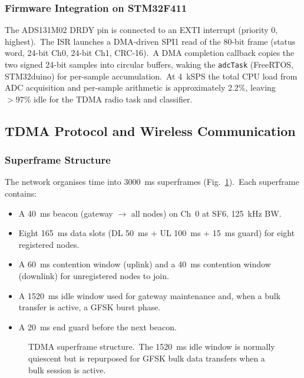 \documentclass[conference]{IEEEtran}
\begin{document}
\subsubsection{Firmware Integration on STM32F411}

The ADS131M02 DRDY pin is connected to an EXTI interrupt (priority 0,
highest).\ The ISR launches a DMA-driven SPI1 read of the 80-bit frame
(status word, 24-bit Ch0, 24-bit Ch1, CRC-16).\ A DMA completion
callback copies the two signed 24-bit samples into circular buffers,
waking the \texttt{adcTask} (FreeRTOS, STM32duino) for per-sample
accumulation.\ At 4~kSPS the total CPU load from ADC acquisition and
per-sample arithmetic is approximately 2.2\%, leaving \(>97\%\) idle
for the TDMA radio task and classifier.

\subsection{TDMA Protocol and Wireless Communication}
\label{ssec:tdma}

\subsubsection{Superframe Structure}

The network organises time into 3000~ms superframes (Fig.\
\ref{fig:superframe}).\ Each superframe contains:
\begin{itemize}
  \item A 40~ms beacon (gateway \(\to\) all nodes) on Ch~0 at
        SF6, 125~kHz BW.
  \item Eight 165~ms data slots (DL 50~ms + UL 100~ms + 15~ms guard)
        for eight registered nodes.
  \item A 60~ms contention window (uplink) and a 40~ms contention
        window (downlink) for unregistered nodes to join.
  \item A 1520~ms idle window used for gateway maintenance and,
        when a bulk transfer is active, a GFSK burst phase.
  \item A 20~ms end guard before the next beacon.
\end{itemize}

\begin{figure}[t]
  \centering
  \framebox{\parbox{\columnwidth}{\centering
    \vspace{1.5cm}
    [Superframe timing diagram:\\
    Beacon (40ms) | Slots 1-8 (8x165ms=1320ms) |\\
    CW-UL (60ms) | CW-DL (40ms) | Idle (1520ms) | Guard (20ms)]
    \vspace{1.5cm}
  }}
  \caption{TDMA superframe structure.\ The 1520~ms idle window is
    normally quiescent but is repurposed for GFSK bulk data transfers
    when a bulk session is active.}
  \label{fig:superframe}
\end{figure}
\end{document}
